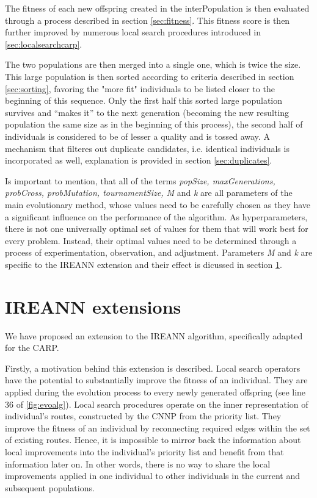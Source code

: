 \documentclass[twoside]{ctuthesis}
\theoremstyle{plain}
\theoremstyle{definition}
\theoremstyle{note}
\begin{document}
The fitness of each new offspring created in the interPopulation is then evaluated through a process described in section \ref{sec:fitness}. This fitness score is then further improved by numerous local search procedures introduced in \ref{sec:localsearchcarp}.

The two populations are then merged into a single one, which is twice the size. This large population is then sorted according to criteria described in section \ref{sec:sorting}, favoring the "more fit" individuals to be listed closer to the beginning of this sequence. Only the first half this sorted large population survives and ``makes it'' to the next generation (becoming the new resulting population the same size as in the beginning of this process), the second half of individuals is considered to be of lesser a quality and is tossed away. A mechanism that filteres out duplicate candidates, i.e. identical individuals is incorporated as well, explanation is provided in section \ref{sec:duplicates}.

Is important to mention, that all of the terms \emph{popSize, maxGenerations, probCross, probMutation, tournamentSize, M} and \emph{k} are all parameters of the main evolutionary method, whose values need to be carefully chosen as they have a significant influence on the performance of the algorithm. As hyperparameters, there is not one universally optimal set of values for them that will work best for every problem. Instead, their optimal values need to be determined through a process of experimentation, observation, and adjustment. Parameters \emph{M} and \emph{k} are specific to the IREANN extension and their effect is dicussed in section \ref{sec:extension}.


\section{IREANN extensions}
\label{sec:extension}
We have proposed an extension to the IREANN algorithm, specifically adapted for the CARP. 

Firstly, a motivation behind this extension is described. Local search operators have the potential to substantially improve the fitness of an individual. They are applied during the evolution process to every newly generated offspring (see line 36 of \ref{fig:evoalg}). Local search procedures operate on the inner representation of individual's routes, constructed by the CNNP from the priority list. They improve the fitness of an individual by reconnecting required edges within the set of existing routes.
Hence, it is impossible to mirror back the information about local improvements into the individual's priority list and benefit from that information later on. In other words,  there is no way to share the local improvements applied in one individual to other individuals in the current and subsequent populations.
\end{document}
